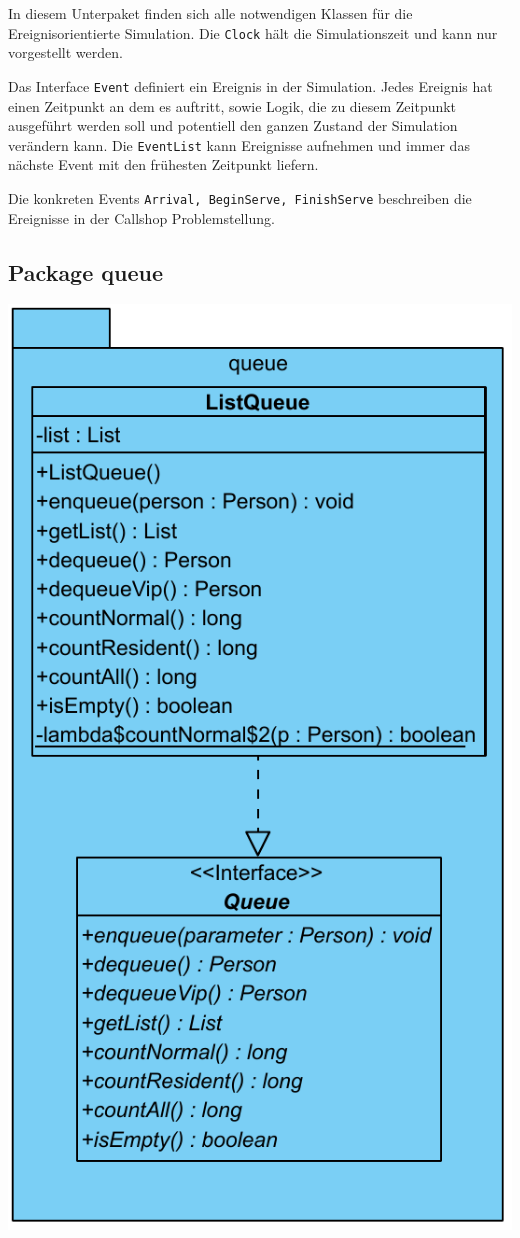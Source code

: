 In diesem Unterpaket finden sich alle notwendigen Klassen für die Ereignisorientierte Simulation. Die \texttt{Clock} hält die Simulationszeit und kann nur vorgestellt werden. 

Das Interface \texttt{Event} definiert ein Ereignis in der Simulation. Jedes Ereignis hat einen Zeitpunkt an dem es auftritt, sowie Logik, die zu diesem Zeitpunkt ausgeführt werden soll und potentiell den ganzen Zustand der Simulation verändern kann. Die \texttt{EventList} kann Ereignisse aufnehmen und immer das nächste Event mit den frühesten Zeitpunkt liefern. 

Die konkreten Events \texttt{Arrival, BeginServe, FinishServe} beschreiben die Ereignisse in der Callshop Problemstellung.

\subsection{Package queue}

\includegraphics[scale=0.3]{abbildungen/uml/queue.pdf}

